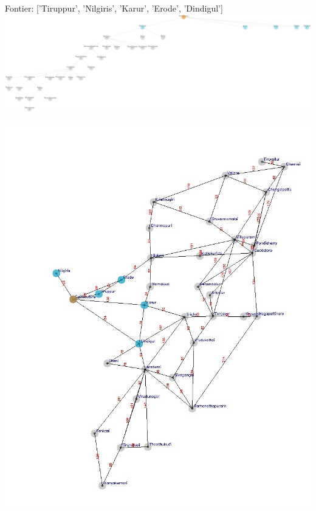 \documentclass[xcolor=table]{beamer}
\begin{document}
\begin{frame}
  { \tiny Fontier: ['Tiruppur', 'Nilgiris', 'Karur', 'Erode', 'Dindigul'] }
  \includegraphics[width=1\textwidth]{../DFSNodes/3-1.png}
  \begin{center}
    \includegraphics[height=0.5\textheight]{../DFSoutput/tamilDFS1.jpg}
  \end{center}
\end{frame}
\end{document}
